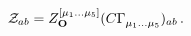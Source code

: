 \begin{equation}\label{eq2}
  {\cal{Z}}_{ab} =
    Z^{[\mu_1\ldots \mu_5]}_{\bf{O}}
    (C\Gamma^{}_{\mu_1 \ldots
    \mu_5})_{ab}\, .
\end{equation}

